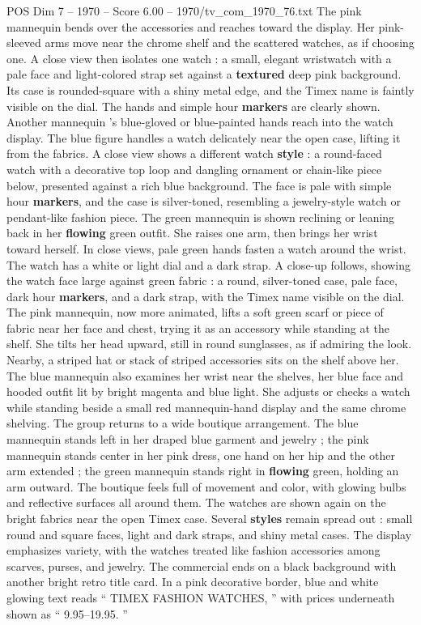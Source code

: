 \begin{textsample}{POS Dim 7 – 1970 – Score 6.00 – 1970/tv\_com\_1970\_76.txt}
The pink mannequin bends over the accessories and reaches toward the display.
Her pink-sleeved arms move near the chrome shelf and the scattered watches, as if choosing one.
A close view then isolates one watch : a small, elegant wristwatch with a pale face and light-colored strap set against a \textbf{textured} deep pink background.
Its case is rounded-square with a shiny metal edge, and the Timex name is faintly visible on the dial.
The hands and simple hour \textbf{markers} are clearly shown.
Another mannequin ’s blue-gloved or blue-painted hands reach into the watch display.
The blue figure handles a watch delicately near the open case, lifting it from the fabrics.
A close view shows a different watch \textbf{style} : a round-faced watch with a decorative top loop and dangling ornament or chain-like piece below, presented against a rich blue background.
The face is pale with simple hour \textbf{markers}, and the case is silver-toned, resembling a jewelry-style watch or pendant-like fashion piece.
The green mannequin is shown reclining or leaning back in her \textbf{flowing} green outfit.
She raises one arm, then brings her wrist toward herself.
In close views, pale green hands fasten a watch around the wrist.
The watch has a white or light dial and a dark strap.
A close-up follows, showing the watch face large against green fabric : a round, silver-toned case, pale face, dark hour \textbf{markers}, and a dark strap, with the Timex name visible on the dial.
The pink mannequin, now more animated, lifts a soft green scarf or piece of fabric near her face and chest, trying it as an accessory while standing at the shelf.
She tilts her head upward, still in round sunglasses, as if admiring the look.
Nearby, a striped hat or stack of striped accessories sits on the shelf above her.
The blue mannequin also examines her wrist near the shelves, her blue face and hooded outfit lit by bright magenta and blue light.
She adjusts or checks a watch while standing beside a small red mannequin-hand display and the same chrome shelving.
The group returns to a wide boutique arrangement.
The blue mannequin stands left in her draped blue garment and jewelry ; the pink mannequin stands center in her pink dress, one hand on her hip and the other arm extended ; the green mannequin stands right in \textbf{flowing} green, holding an arm outward.
The boutique feels full of movement and color, with glowing bulbs and reflective surfaces all around them.
The watches are shown again on the bright fabrics near the open Timex case.
Several \textbf{styles} remain spread out : small round and square faces, light and dark straps, and shiny metal cases.
The display emphasizes variety, with the watches treated like fashion accessories among scarves, purses, and jewelry.
The commercial ends on a black background with another bright retro title card.
In a pink decorative border, blue and white glowing text reads “ TIMEX FASHION WATCHES, ” with prices underneath shown as “ 9.95–19.95. ”

\end{textsample}
